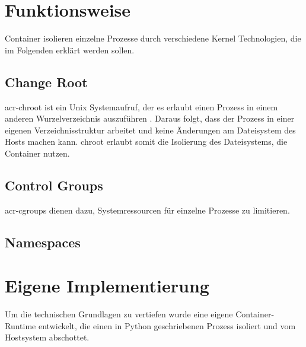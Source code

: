 \section{Funktionsweise}
\label{sec:funktionsweise}

Container isolieren einzelne Prozesse durch verschiedene Kernel Technologien, die im Folgenden erklärt werden sollen.
\subsection{Change Root}
\label{sec:chroot}
\gls{acr-chroot} ist ein Unix Systemaufruf, der es erlaubt einen Prozess in einem anderen Wurzelverzeichnis auszuführen \citep{Chroot1LinuxManualPage}. Daraus folgt, dass der Prozess in einer eigenen Verzeichnisstruktur arbeitet und keine Änderungen am Dateisystem des Hosts machen kann. chroot erlaubt somit die Isolierung des Dateisystems, die Container nutzen.

\subsection{Control Groups}
\label{sec:cgroups}
\glspl{acr-cgroup} dienen dazu, Systemressourcen für einzelne Prozesse zu limitieren. 

\subsection{Namespaces}
\label{sec:namespaces}


\section{Eigene Implementierung}
\label{sec:eigeneImpl}

Um die technischen Grundlagen zu vertiefen wurde eine eigene Container-Runtime entwickelt, die einen in Python geschriebenen Prozess isoliert und vom Hostsystem abschottet.